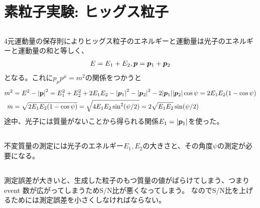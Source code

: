 \documentclass[../../master.tex]{subfiles}
\begin{document}
\section{素粒子実験: ヒッグス粒子}
\subsection{}
4元運動量の保存則によりヒッグス粒子のエネルギーと運動量は光子のエネルギーと運動量の和と等しく、
\begin{equation}\begin{aligned}[b]
    E =E_1+E_2, \vb*{p}=\vb*{p}_1+\vb*{p}_2
\end{aligned}\end{equation}
となる。これに\(p_\mu p^\mu=m^2\)の関係をつかうと
\begin{equation}\begin{aligned}[b]
    m^2 &= E^2 -\abs{\vb{p}}^2
    = E_1^2+E_2^2+2E_1E_2 - \abs{\vb*{p}_1}^2 - \abs{\vb*{p}_2}^2 - 2\abs{\vb*{p}_1}\abs{\vb*{p}_2}\cos\psi
    = 2E_1E_2(1-\cos\psi)\\
    m &= \sqrt{2E_1E_2(1-\cos\psi)}=\sqrt{4E_1E_2\sin^2(\psi/2)} = 2\sqrt{E_1E_2}\sin(\psi/2)
\end{aligned}\end{equation}
途中、光子には質量がないことから得られる関係\(E_1=\abs{\vb*{p}_1}\)を使った。

\subsection{}
不変質量の測定には光子のエネルギー\(E_1,E_2\)の大きさと、その角度\(\psi\)の測定が必要になる。
\subsection{}
測定誤差が大きいと、生成した粒子のもつ質量の値がばらけてしまう、つまり event 数が広がってしまうためS/N比が悪くなってしまう。
なのでS/N比を上げるためには測定誤差を小さくしなければならない。
\end{document}

